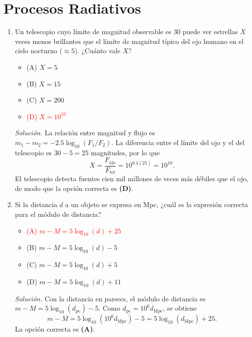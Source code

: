 \documentclass[11pt]{article}
\begin{document}
\section{Procesos Radiativos}
\begin{enumerate}
    \item Un telescopio cuyo límite de magnitud observable es 30 puede ver estrellas $X$ veces menos brillantes que el límite de magnitud típico del ojo humano en el cielo nocturno ($\approx5$). ¿Cuánto vale $X$?
    \begin{itemize}
        \item (A) $X=5$
        \item (B) $X=15$
        \item (C) $X=200$
        \item \textcolor{red}{(D) $X=10^{10}$}
    \end{itemize}
    \textit{Solución.} La relación entre magnitud y flujo es $m_1-m_2=-2.5\log_{10}(F_1/F_2)$. La diferencia entre el límite del ojo y el del telescopio es $30-5=25$ magnitudes, por lo que
    \[
        X=\frac{F_{\mathrm{ojo}}}{F_{\mathrm{tel}}}=10^{0.4(25)}=10^{10}.
    \]
    El telescopio detecta fuentes cien mil millones de veces más débiles que el ojo, de modo que la opción correcta es \textbf{(D)}. \parencite{chaparro2026}

    \item Si la distancia $d$ a un objeto se expresa en Mpc, ¿cuál es la expresión correcta para el módulo de distancia?
    \begin{itemize}
        \item \textcolor{red}{(A) $m-M=5\log_{10}(d)+25$}
        \item (B) $m-M=5\log_{10}(d)-5$
        \item (C) $m-M=5\log_{10}(d)+5$
        \item (D) $m-M=5\log_{10}(d)+11$
    \end{itemize}
    \textit{Solución.} Con la distancia en parsecs, el módulo de distancia es $m-M=5\log_{10}(d_{\mathrm{pc}})-5$. Como $d_{\mathrm{pc}}=10^6d_{\mathrm{Mpc}}$, se obtiene
    \[
        m-M=5\log_{10}(10^6d_{\mathrm{Mpc}})-5=5\log_{10}(d_{\mathrm{Mpc}})+25.
    \]
    La opción correcta es \textbf{(A)}. \parencite{chaparro2026}


\end{enumerate}
\end{document}
